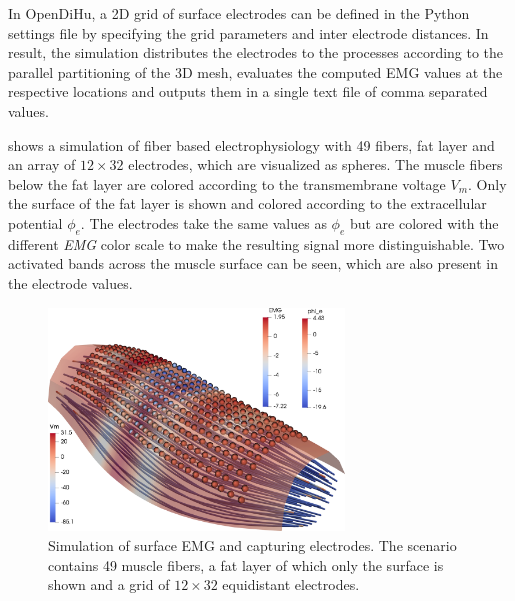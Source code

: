 In OpenDiHu, a 2D grid of surface electrodes can be defined in the Python settings file by specifying the grid parameters and inter electrode distances. In result, the simulation distributes the electrodes to the processes according to the parallel partitioning of the 3D mesh, evaluates the computed EMG values at the respective locations and outputs them in a single text file of comma separated values.

 shows a simulation of fiber based electrophysiology with 49 fibers, fat layer and an array of $12\times 32$ electrodes, which are visualized as spheres. The muscle fibers below the fat layer are colored according to the transmembrane voltage $V_m$. Only the surface of the fat layer is shown and colored according to the extracellular potential $\phi_e$. The electrodes take the same values as $\phi_e$ but are colored with the different \emph{EMG} color scale to make the resulting signal more distinguishable. Two activated bands across the muscle surface can be seen, which are also present in the electrode values.

\begin{figure}
  \centering%
  \includegraphics[width=0.7\textwidth]{images/results/application/fibers_fat_emg2.png}%
  \caption{Simulation of surface EMG and capturing electrodes. The scenario contains 49 muscle fibers, a fat layer of which only the surface is shown and a grid of $12 \times 32$ equidistant electrodes.}%
  \label{fig:fibers_fat_emg2_electrodes}%
\end{figure}

